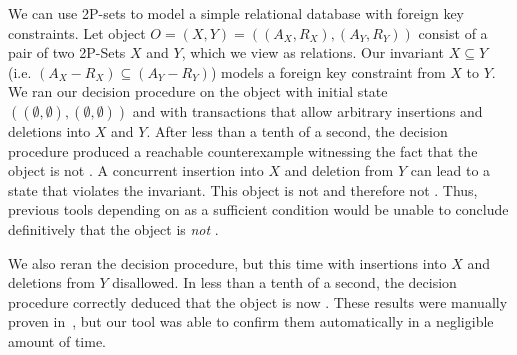 We can use 2P-sets to model a simple relational database with foreign key
constraints. Let object $O = (X, Y) = ((A_X, R_X), (A_Y, R_Y))$ consist of a
pair of two 2P-Sets $X$ and $Y$, which we view as relations. Our invariant $X
\subseteq Y$ (i.e. $(A_X - R_X) \subseteq (A_Y - R_Y)$) models a foreign key
constraint from $X$ to $Y$. We ran our decision procedure on the object with
initial state $((\emptyset, \emptyset), (\emptyset, \emptyset))$ and with
transactions that allow arbitrary insertions and deletions into $X$ and $Y$.
After less than a tenth of a second, the decision procedure produced a
reachable counterexample witnessing the fact that the object is not
\invariantconfluent{}. A concurrent insertion into $X$ and deletion from $Y$
can lead to a state that violates the invariant. This object is not
\invariantconfluent{} and therefore not \invariantclosed{}. Thus, previous
tools depending on \invariantclosure{} as a sufficient condition would be
unable to conclude definitively that the object is \emph{not}
\invariantconfluent{}.

We also reran the decision procedure, but this time with insertions into $X$
and deletions from $Y$ disallowed. In less than a tenth of a second, the
decision procedure correctly deduced that the object is now
\invariantconfluent{}. These results were manually proven
in~\cite{bailis2014coordination}, but our tool was able to confirm them
automatically in a negligible amount of time.

%

